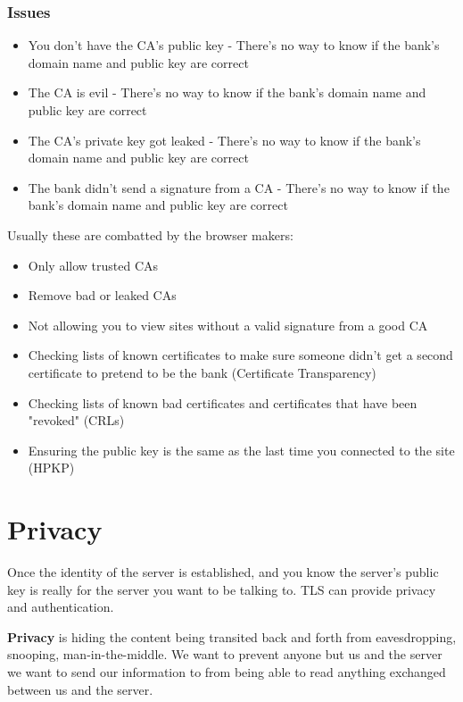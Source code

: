 \documentclass[../CMPUT-404-Notes.tex]{subfiles}
\begin{document}
\subsubsection{Issues}
\begin{itemize}
  \item You don't have the CA's public key - There's no way to know if the bank's domain name and public key are correct
  \item The CA is evil - There's no way to know if the bank's domain name and public key are correct 
  \item The CA's private key got leaked - There's no way to know if the bank's domain name and public key are correct
  \item The bank didn't send a signature from a CA - There's no way to know if the bank's domain name and public key are correct
\end{itemize}

Usually these are combatted by the browser makers:
\begin{itemize}
  \item Only allow trusted CAs
  \item Remove bad or leaked CAs
  \item Not allowing you to view sites without a valid signature from a good CA
  \item Checking lists of known certificates to make sure someone didn't get a second certificate to pretend to be the bank (Certificate Transparency)
  \item Checking lists of known bad certificates and certificates that have been "revoked" (CRLs)
  \item Ensuring the public key is the same as the last time you connected to the site (HPKP)
\end{itemize}

\section{Privacy}
Once the identity of the server is established, and you know the server's public key is really for the server you want to be talking to. TLS can provide privacy and authentication. 

\textbf{Privacy} is hiding the content being transited back and forth from eavesdropping, snooping, man-in-the-middle. We want to prevent anyone but us and the server we want to send our information to from being able to read anything exchanged between us and the server.
\end{document}
